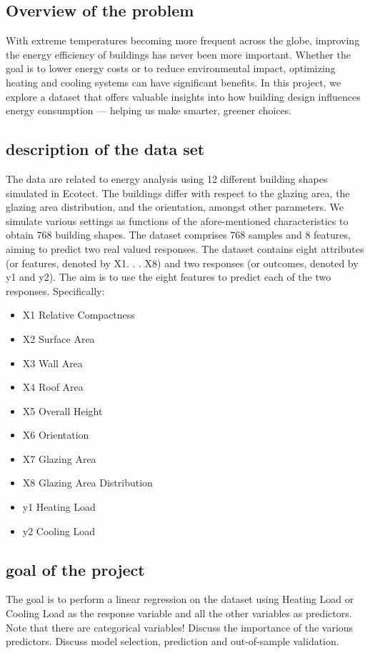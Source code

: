 \documentclass[a4paper,12pt]{article}
\begin{document}
\subsection{Overview of the problem}
With extreme temperatures becoming more frequent across the globe, improving the energy efficiency of buildings has never been more important. Whether the goal is to lower energy costs or to reduce environmental impact, optimizing heating and cooling systems can have significant benefits. In this project, we explore a dataset that offers valuable insights into how building design influences energy consumption — helping us make smarter, greener choices.




\subsection{ description of the data set}
The data are related to energy analysis using 12 different building
shapes simulated in Ecotect. The buildings differ with respect to the glazing area, the glazing
area distribution, and the orientation, amongst other parameters. We simulate various settings as functions of the afore-mentioned characteristics to obtain 768 building shapes. The
dataset comprises 768 samples and 8 features, aiming to predict two real valued responses.
The dataset contains eight attributes (or features, denoted by X1. . . X8) and two responses
(or outcomes, denoted by y1 and y2). The aim is to use the eight features to predict each of
the two responses.
Specifically:
\begin{itemize}
    \item X1 Relative Compactness
    \item X2 Surface Area
    \item X3 Wall Area
    \item X4 Roof Area
    \item X5 Overall Height
    \item X6 Orientation
    \item X7 Glazing Area
    \item X8 Glazing Area Distribution
    \item y1 Heating Load
    \item y2 Cooling Load
\end{itemize}

\subsection{goal of the project}
The goal is to perform a linear regression on the dataset using Heating Load or Cooling Load as the response variable and all the other variables as predictors. Note that there are categorical variables! Discuss the importance of the various predictors. Discuss model selection, prediction and out-of-sample validation.
\end{document}
